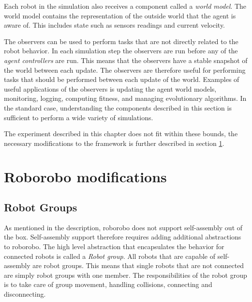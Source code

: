 Each robot in the simulation also receives a component called a \emph{world model}.
The world model contains the representation of the outside world that the agent is aware of.
This includes state such as sensors readings and current velocity.

The observers can be used to perform tasks that are not directly related to the robot behavior.
In each simulation step the observers are run before any of the \emph{agent controllers} are run.
This means that the observers have a stable snapshot of the world between each update.
The observers are therefore useful for performing tasks that should be performed between each update of the world.
Examples of useful applications of the observers is updating the agent world models, monitoring, logging, computing fitness, and managing evolutionary algorithms.
In the standard case, understanding the components described in this section is sufficient to perform a wide variety of simulations.


The experiment described in this chapter does not fit within these bounds, the necessary modifications to the framework is further described in section \ref{sec:modifications}.


\clearpage

\section{Roborobo modifications}
\label{sec:modifications}
	\subsection{Robot Groups}
	As mentioned in the description, roborobo does not support self-assembly out of the box.
	Self-assembly support therefore requires adding additional abstractions to roborobo.
	The high level abstraction that encapsulates the behavior for connected robots is called a \emph{Robot group}.
	All robots that are capable of self-assembly are robot groups.
	This means that single robots that are not connected are simply robot groups with one member.
	The responsibilities of the robot group is to take care of group movement, handling collisions, connecting and disconnecting. 
